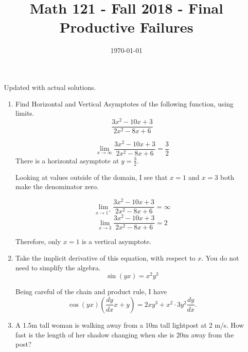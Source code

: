 \documentclass{exam}
\title{Math 121 - Fall 2018 - Final Productive Failures}
\date\today
\begin{document}
\maketitle
\bigskip

\normalsize
\begin{center}
Updated with actual solutions.
\end{center}
\begin{enumerate}
\item Find Horizontal and Vertical Asymptotes of the following function, using limits. $$ \frac{3x^2 - 10x +3}{2x^2 - 8x +6}$$

$$\lim_{x \rightarrow \infty} \frac{3x^2 - 10x +3}{2x^2 - 8x +6} = \frac{3}{2}$$ There is a horizontal asymptote at $y = \frac{3}{2}.$

Looking at values outside of the domain, I see that $x = 1$ and $x = 3$ both make the denominator zero.

$$\lim_{x \rightarrow 1^+} \frac{3x^2 - 10x +3}{2x^2 - 8x +6}  = \infty$$
$$\lim_{x \rightarrow 3} \frac{3x^2 - 10x +3}{2x^2 - 8x +6}  = 2$$

Therefore, only $x = 1$ is a vertical asymptote.

\item Take the implicit derivative of this equation, with respect to $x$. You do not need to simplify the algebra.
$$\sin(yx) = x^2y^3$$

Being careful of the chain and product rule, I have
$$\cos(yx)\left(\frac{dy}{dx} x + y\right) = 2xy^3 + x^2\cdot3y^2 \frac{dy}{dx}.$$
\item A 1.5m tall woman is walking away from a 10m tall lightpost at 2 m/s. How fast is the length of her shadow changing when she is 20m away from the post?


\end{enumerate}
\end{document}
